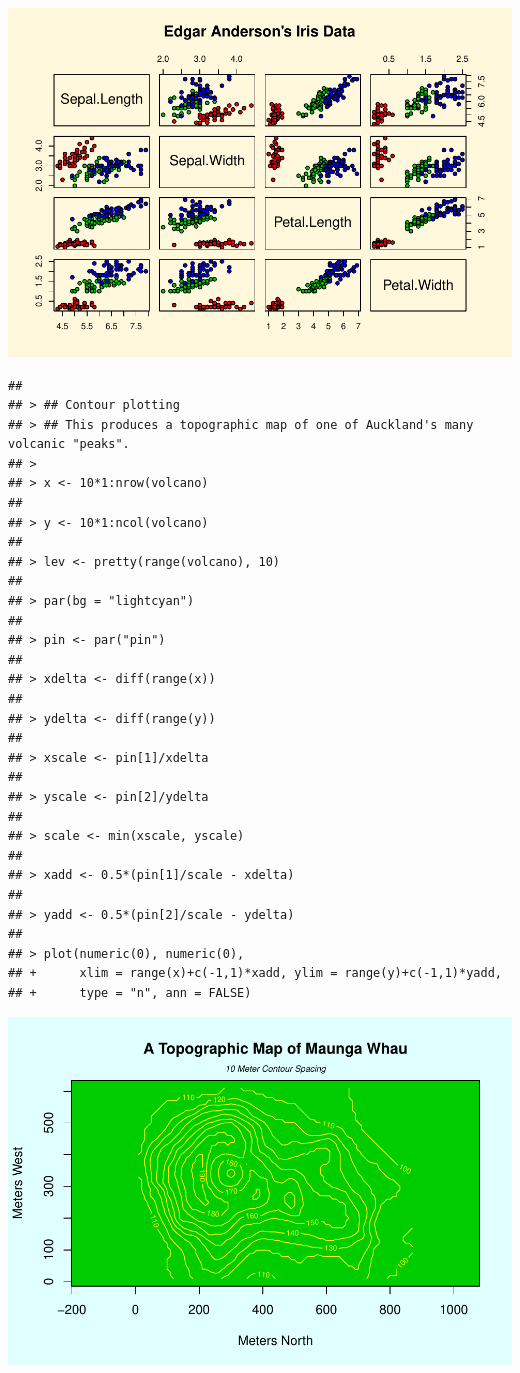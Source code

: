 \documentclass[]{book}
\begin{document}
\includegraphics{TudodoR_files/figure-latex/unnamed-chunk-147-9.pdf}

\begin{verbatim}
## 
## > ## Contour plotting
## > ## This produces a topographic map of one of Auckland's many volcanic "peaks".
## > 
## > x <- 10*1:nrow(volcano)
## 
## > y <- 10*1:ncol(volcano)
## 
## > lev <- pretty(range(volcano), 10)
## 
## > par(bg = "lightcyan")
## 
## > pin <- par("pin")
## 
## > xdelta <- diff(range(x))
## 
## > ydelta <- diff(range(y))
## 
## > xscale <- pin[1]/xdelta
## 
## > yscale <- pin[2]/ydelta
## 
## > scale <- min(xscale, yscale)
## 
## > xadd <- 0.5*(pin[1]/scale - xdelta)
## 
## > yadd <- 0.5*(pin[2]/scale - ydelta)
## 
## > plot(numeric(0), numeric(0),
## +      xlim = range(x)+c(-1,1)*xadd, ylim = range(y)+c(-1,1)*yadd,
## +      type = "n", ann = FALSE)
\end{verbatim}

\includegraphics{TudodoR_files/figure-latex/unnamed-chunk-147-10.pdf}
\end{document}
